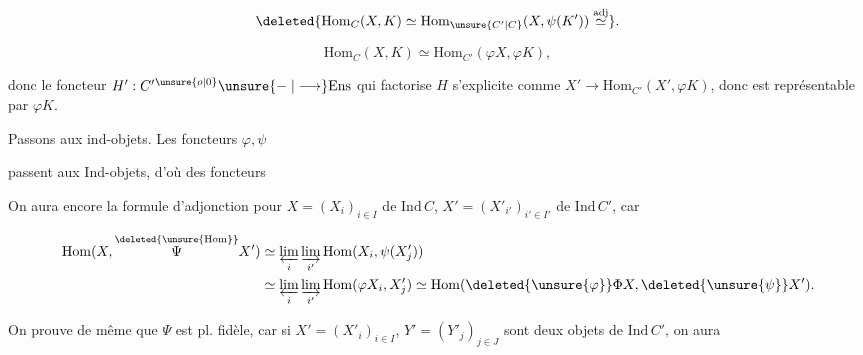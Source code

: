 \[
 \deleted{\mathrm{Hom}_C(X,K)\simeq\mathrm{Hom}_{\unsure{C'|C}}(X,\psi(K'))\overset{\mathrm{adj}}{\simeq}}.
\]

\[
 \mathrm{Hom}_C(X,K)\simeq\mathrm{Hom}_{C'}(\varphi X,\varphi K),
\]

donc le foncteur $H':C'{}^{\unsure{o|0}}\unsure{\relbar|\longrightarrow}\mathrm{Ens}$ qui factorise $H$ s'explicite comme $X'\to\mathrm{Hom}_{C'}(X',\varphi K)$,  donc est représentable par $\varphi K$.

Passons  aux ind-objets.  Les foncteurs $\varphi,\psi$


passent aux Ind-objets, d'où des foncteurs


On aura encore la formule d'adjonction pour $X=(X_i)_{i\in I}$ de $\mathrm{Ind}\,C$, $X'=(X'_{i'})_{i'\in I'}$ de $\mathrm{Ind}\,C'$, car

\[
\begin{aligned}
 \mathrm{Hom}(X,\overset{\deleted{\unsure{\mathrm{Hom}}}}{\Psi}X')&
 \simeq\varprojlim_i\varinjlim_{i'}\mathrm{Hom}(X_i,\psi(X'_j))\\
 &\simeq\varprojlim_i\varinjlim_{i'}\mathrm{Hom}(\varphi X_i,X'_j)
 \simeq\mathrm{Hom}(\deleted{\unsure{\varphi}}\Phi X,\deleted{\unsure{\psi}}X').
\end{aligned}
\]


On prouve de même que $\Psi$ est pl. fidèle, car si $X'=(X'_i)_{i\in I}$, $Y'=(Y'_j)_{j\in J}$ sont deux objets de $\mathrm{Ind}\,C'$, on aura


